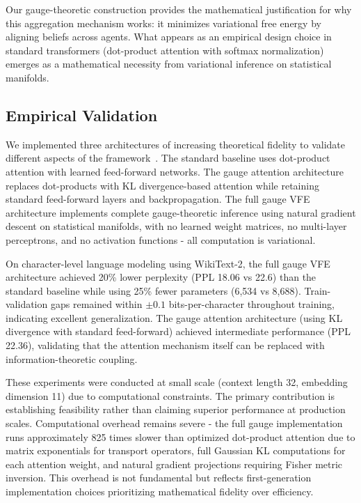 \documentclass[11pt]{article}
\begin{document}
Our gauge-theoretic construction provides the mathematical justification for why this aggregation mechanism works: it minimizes variational free energy by aligning beliefs across agents. What appears as an empirical design choice in standard transformers (dot-product attention with softmax normalization) emerges as a mathematical necessity from variational inference on statistical manifolds.

\subsection{Empirical Validation}

We implemented three architectures of increasing theoretical fidelity to validate different aspects of the framework~\cite{Dennis2025transformer}. The standard baseline uses dot-product attention with learned feed-forward networks. The gauge attention architecture replaces dot-products with KL divergence-based attention while retaining standard feed-forward layers and backpropagation. The full gauge VFE architecture implements complete gauge-theoretic inference using natural gradient descent on statistical manifolds, with no learned weight matrices, no multi-layer perceptrons, and no activation functions - all computation is variational.

On character-level language modeling using WikiText-2, the full gauge VFE architecture achieved 20\% lower perplexity (PPL 18.06 vs 22.6) than the standard baseline while using 25\% fewer parameters (6,534 vs 8,688). Train-validation gaps remained within $\pm 0.1$ bits-per-character throughout training, indicating excellent generalization. The gauge attention architecture (using KL divergence with standard feed-forward) achieved intermediate performance (PPL 22.36), validating that the attention mechanism itself can be replaced with information-theoretic coupling.

These experiments were conducted at small scale (context length 32, embedding dimension 11) due to computational constraints. The primary contribution is establishing feasibility rather than claiming superior performance at production scales. Computational overhead remains severe - the full gauge implementation runs approximately 825 times slower than optimized dot-product attention due to matrix exponentials for transport operators, full Gaussian KL computations for each attention weight, and natural gradient projections requiring Fisher metric inversion. This overhead is not fundamental but reflects first-generation implementation choices prioritizing mathematical fidelity over efficiency.
\end{document}
